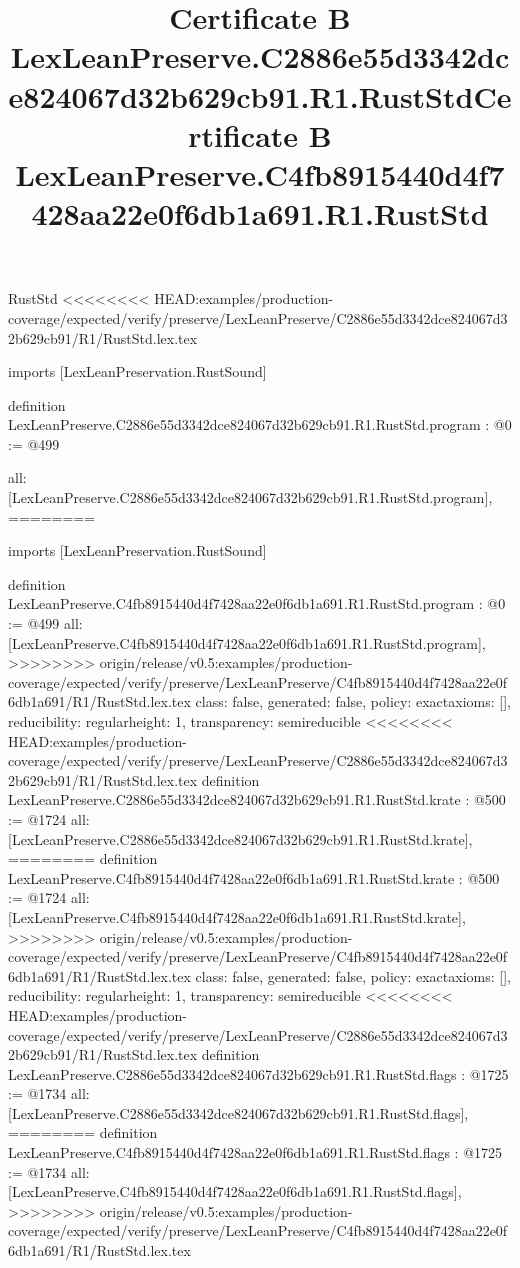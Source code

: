 \begin{lexlean}{RustStd}
<<<<<<<< HEAD:examples/production-coverage/expected/verify/preserve/LexLeanPreserve/C2886e55d3342dce824067d32b629cb91/R1/RustStd.lex.tex
\title{Certificate B LexLeanPreserve.C2886e55d3342dce824067d32b629cb91.R1.RustStd}
\begin{coremodule}
imports [LexLeanPreservation.RustSound]

definition LexLeanPreserve.C2886e55d3342dce824067d32b629cb91.R1.RustStd.program : @0 := @499 {
  all: [LexLeanPreserve.C2886e55d3342dce824067d32b629cb91.R1.RustStd.program],
========
\title{Certificate B LexLeanPreserve.C4fb8915440d4f7428aa22e0f6db1a691.R1.RustStd}
\begin{coremodule}
imports [LexLeanPreservation.RustSound]

definition LexLeanPreserve.C4fb8915440d4f7428aa22e0f6db1a691.R1.RustStd.program : @0 := @499 {
  all: [LexLeanPreserve.C4fb8915440d4f7428aa22e0f6db1a691.R1.RustStd.program],
>>>>>>>> origin/release/v0.5:examples/production-coverage/expected/verify/preserve/LexLeanPreserve/C4fb8915440d4f7428aa22e0f6db1a691/R1/RustStd.lex.tex
  class: false,
  generated: false,
  policy: exact{axioms: []},
  reducibility: regular{height: 1},
  transparency: semireducible
}
<<<<<<<< HEAD:examples/production-coverage/expected/verify/preserve/LexLeanPreserve/C2886e55d3342dce824067d32b629cb91/R1/RustStd.lex.tex
definition LexLeanPreserve.C2886e55d3342dce824067d32b629cb91.R1.RustStd.krate : @500 := @1724 {
  all: [LexLeanPreserve.C2886e55d3342dce824067d32b629cb91.R1.RustStd.krate],
========
definition LexLeanPreserve.C4fb8915440d4f7428aa22e0f6db1a691.R1.RustStd.krate : @500 := @1724 {
  all: [LexLeanPreserve.C4fb8915440d4f7428aa22e0f6db1a691.R1.RustStd.krate],
>>>>>>>> origin/release/v0.5:examples/production-coverage/expected/verify/preserve/LexLeanPreserve/C4fb8915440d4f7428aa22e0f6db1a691/R1/RustStd.lex.tex
  class: false,
  generated: false,
  policy: exact{axioms: []},
  reducibility: regular{height: 1},
  transparency: semireducible
}
<<<<<<<< HEAD:examples/production-coverage/expected/verify/preserve/LexLeanPreserve/C2886e55d3342dce824067d32b629cb91/R1/RustStd.lex.tex
definition LexLeanPreserve.C2886e55d3342dce824067d32b629cb91.R1.RustStd.flags : @1725 := @1734 {
  all: [LexLeanPreserve.C2886e55d3342dce824067d32b629cb91.R1.RustStd.flags],
========
definition LexLeanPreserve.C4fb8915440d4f7428aa22e0f6db1a691.R1.RustStd.flags : @1725 := @1734 {
  all: [LexLeanPreserve.C4fb8915440d4f7428aa22e0f6db1a691.R1.RustStd.flags],
>>>>>>>> origin/release/v0.5:examples/production-coverage/expected/verify/preserve/LexLeanPreserve/C4fb8915440d4f7428aa22e0f6db1a691/R1/RustStd.lex.tex
}}}
\end{coremodule}}
\end{coremodule}
\end{lexlean}
